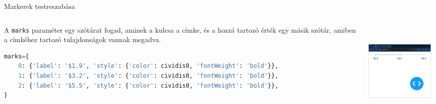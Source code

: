 \documentclass[english, aspectratio=169]{beamer}
\begin{document}
\begin{frame}[fragile]{Markerek testreszabása}
	\begin{columns}
		\begin{column}{.5\textwidth}
			A \texttt{marks} paraméter egy szótárat fogad, aminek a kulcsa a címke, és a hozzá tartozó érték egy másik szótár, amiben a címkéhez tartozó tulajdonságok vannak megadva.
			\begin{lstlisting}[language=python]
marks={
	0: {'label': '$1.9', 'style': {'color': cividis0, 'fontWeight': 'bold'}},
	1: {'label': '$3.2', 'style': {'color': cividis0, 'fontWeight': 'bold'}},
	2: {'label': '$5.5', 'style': {'color': cividis0, 'fontWeight': 'bold'}},
}				
			\end{lstlisting}
		\end{column}
		\begin{column}{.5\textwidth}
			\begin{center}
				\includegraphics[width=5cm, height=5cm, keepaspectratio]{images/scatter_18.png}
			\end{center}
		\end{column}
	\end{columns}
\end{frame}
\end{document}

